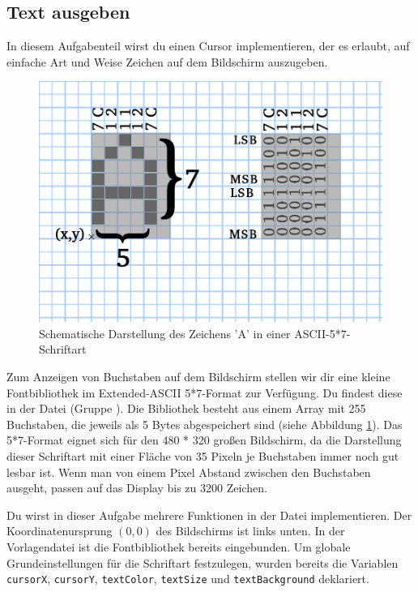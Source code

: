 \subsection{Text ausgeben}
In diesem Aufgabenteil wirst du einen Cursor implementieren, der es erlaubt, auf einfache Art und Weise Zeichen auf dem Bildschirm auszugeben.
%
\begin{figure}[!htb]
	\begin{centering}
		\includegraphics[width=.5\textwidth]{./05_c/figures/ASCII57.png}
		\caption{Schematische Darstellung des Zeichens 'A' in einer ASCII-5*7-Schriftart}
		\label{fig:ascii57}
	\end{centering}
\end{figure}
%
Zum Anzeigen von Buchstaben auf dem Bildschirm stellen wir dir eine kleine Fontbibliothek im Extended-ASCII 5*7-Format zur Verfügung.
Du findest diese in der Datei  (Gruppe ).
Die Bibliothek besteht aus einem Array mit 255 Buchstaben, die jeweils als 5 Bytes abgespeichert sind (siehe Abbildung \ref{fig:ascii57}).
Das 5*7-Format eignet sich für den 480 * 320 großen Bildschirm, da die Darstellung dieser Schriftart mit einer Fläche von 35 Pixeln je Buchstaben immer noch gut lesbar ist.
Wenn man von einem Pixel Abstand zwischen den Buchstaben ausgeht, passen auf das Display bis zu 3200 Zeichen.

Du wirst in dieser Aufgabe mehrere Funktionen in der Datei  implementieren.
Der Koordinatenursprung $(0,0)$ des Bildschirms ist links unten.
In der Vorlagendatei  ist die Fontbibliothek  bereits eingebunden.
Um globale Grundeinstellungen für die Schriftart festzulegen, wurden bereits die Variablen \lstinline|cursorX|, \lstinline|cursorY|, \lstinline|textColor|, \lstinline|textSize| und \lstinline|textBackground| deklariert. 

